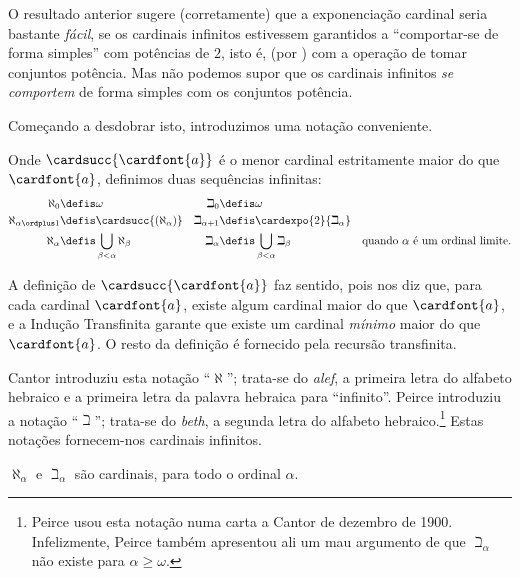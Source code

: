\documentclass[../../../include/open-logic-section]{subfiles}
\begin{document}


O resultado anterior sugere (corretamente) que a exponenciação cardinal
seria bastante \emph{fácil}, se os cardinais infinitos estivessem garantidos a
``comportar-se de forma simples'' com potências de $2$, isto é, (por
) com a operação de tomar conjuntos potência. Mas
não podemos supor que os cardinais infinitos \emph{se comportem} de forma simples com
os conjuntos potência.

Começando a desdobrar isto, introduzimos uma notação conveniente.

\begin{defn}
Onde $\cardsucc{\cardfont{a}}$ é o menor cardinal estritamente maior
do que $\cardfont{a}$, definimos duas sequências infinitas:
\begin{align*}
	\aleph_{0} &\defis \omega & 		
	\beth_{0} &\defis \omega\\
	\aleph_{\alpha \ordplus 1} &\defis \cardsucc{(\aleph_{\alpha})} &
	\beth_{\alpha+1} &\defis \cardexpo{2}{\beth_{\alpha}}\\
	\aleph_{\alpha} &\defis \bigcup_{\beta< \alpha} \aleph_{\beta} &
	\beth_{\alpha} &\defis \bigcup_{\beta < \alpha}\beth_{\beta} & \text{quando $\alpha$ é um ordinal limite}.
	\end{align*}
\end{defn}

A definição de $\cardsucc{\cardfont{a}}$ faz sentido, pois
 nos diz que, para cada
cardinal $\cardfont{a}$, existe algum cardinal maior do que
$\cardfont{a}$, e a Indução Transfinita garante que existe um
cardinal \emph{mínimo} maior do que $\cardfont{a}$. O resto da
definição é fornecido pela recursão transfinita.

Cantor introduziu esta notação ``$\aleph$''; trata-se do \emph{alef},
a primeira letra do alfabeto hebraico e a primeira letra da
palavra hebraica para ``infinito''. Peirce introduziu a notação ``$\beth$'';
trata-se do \emph{beth}, a segunda letra do
alfabeto hebraico.\footnote{Peirce usou esta notação numa carta a
Cantor de dezembro de 1900. Infelizmente, Peirce também apresentou ali um mau
argumento de que $\beth_\alpha$ não existe para $\alpha \geq
\omega$.} Estas notações fornecem-nos cardinais infinitos.

\begin{prop}
$\aleph_\alpha$ e $\beth_\alpha$ são cardinais, para todo o
ordinal $\alpha$. 
\end{prop}
\end{document}
